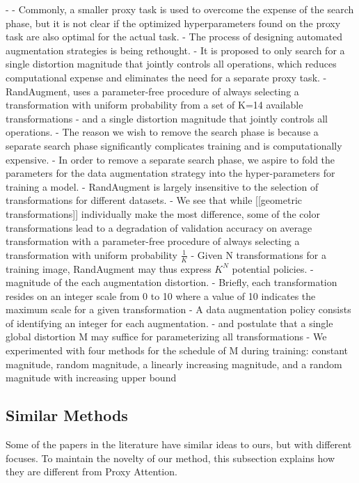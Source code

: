 - \cite{cubukRandaugmentPracticalAutomated2020}
- Commonly, a smaller proxy task is used to overcome the expense of the search phase, but it is not clear if the optimized hyperparameters found on the proxy task are also optimal for the actual task.
- The process of designing automated augmentation strategies is being rethought.
- It is proposed to only search for a single distortion magnitude that jointly controls all operations, which reduces computational expense and eliminates the need for a separate proxy task.
- RandAugment, uses a parameter-free procedure of always selecting a transformation with uniform probability from a set of K=14 available transformations
- and a single distortion magnitude that jointly controls all operations.
- The reason we wish to remove the search phase is because a separate search phase significantly complicates training and is computationally expensive.
- In order to remove a separate search phase, we aspire to fold the parameters for the data augmentation strategy into the hyper-parameters for training a model.
- RandAugment is largely insensitive to the selection of transformations for different datasets.
- We see that while [[geometric transformations]] individually make the most difference, some of the color transformations lead to a degradation of validation accuracy on average
transformation with a parameter-free procedure of always selecting a transformation with uniform probability $\frac{1}{K}$ 
- Given N transformations for a training image, RandAugment may thus express $K^{N}$ potential policies.
- magnitude of the each augmentation distortion.
- Briefly, each transformation resides on an integer scale from 0 to 10 where a value of 10 indicates the maximum scale for a given transformation
- A data augmentation policy consists of identifying an integer for each augmentation.
- and postulate that a single global distortion M may suffice for parameterizing all transformations
- We experimented with four methods for the schedule of M during training: constant magnitude, random magnitude, a linearly increasing magnitude, and a random magnitude with increasing upper bound

\subsection{Similar Methods}
Some of the papers in the literature have similar ideas to ours, but with different focuses. To maintain the novelty of our method, this subsection explains how they are different from Proxy Attention.

